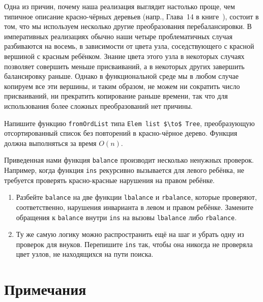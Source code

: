 \begin{remark}
  Одна из причин, почему наша реализация выглядит настолько проще, чем
  типичное описание красно-чёрных деревьев (напр., Глава~14 в
  книге~\cite{CormenLeisersonRivest1990}), состоит в том, что мы
  используем несколько другие преобразования перебалансировки. В
  императивных реализациях обычно наши четыре проблематичных случая
  разбиваются на восемь, в зависимости от цвета узла, соседствующего с
  красной вершиной с красным ребёнком.  Знание цвета этого узла в
  некоторых случаях позволяет совершить меньше присваиваний, а в
  некоторых других завершить балансировку раньше. Однако в
  функциональной среде мы в любом случае копируем все эти вершины, и
  таким образом, не можем ни сократить число присваиваний, ни
  прекратить копирование раньше времени, так что для использования
  более сложных преобразований нет причины.
\end{remark}

\begin{exercise}\label{ex:3.9}
  Напишите функцию \lstinline!fromOrdList! типа \lstinline!Elem list $\to$ Tree!,
  преобразующую отсортированный список без повторений в красно-чёрное
  дерево. Функция должна выполняться за время $O(n)$.
\end{exercise}

\begin{exercise}\label{ex:3.10}
  Приведенная нами функция \lstinline!balance! производит несколько
  ненужных проверок. Например, когда функция \lstinline!ins!
  рекурсивно вызывается для левого ребёнка, не требуется проверять
  красно-красные нарушения на правом ребёнке.
  \begin{enumerate}
  \item Разбейте \lstinline!balance! на две функции
    \lstinline!lbalance! и \lstinline!rbalance!, которые проверяют,
    соответственно, нарушения инварианта в левом и правом
    ребёнке. Замените обращения к \lstinline!balance! внутри
    \lstinline!ins! на вызовы \lstinline!lbalance! либо \lstinline!rbalance!.
  \item Ту же самую логику можно распространить ещё на шаг и убрать
    одну из проверок для внуков. Перепишите \lstinline!ins! так, чтобы
    она никогда не проверяла цвет узлов, не находящихся на пути поиска.
  \end{enumerate}
\end{exercise}

\section{Примечания}
\label{sc:3.4}

